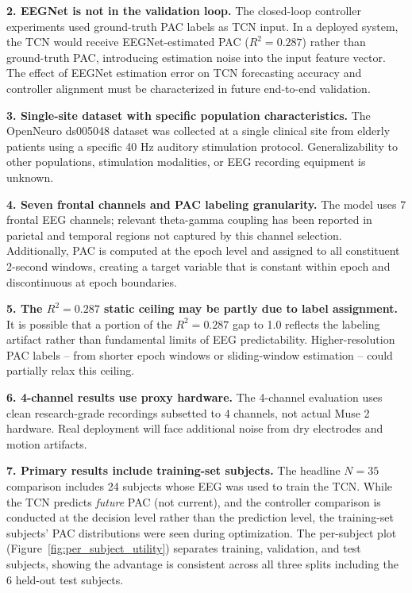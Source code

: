 \documentclass[11pt,letterpaper]{article}
\begin{document}
\textbf{2. EEGNet is not in the validation loop.} The closed-loop controller experiments used ground-truth PAC labels as TCN input. In a deployed system, the TCN would receive EEGNet-estimated PAC ($R^2 = 0.287$) rather than ground-truth PAC, introducing estimation noise into the input feature vector. The effect of EEGNet estimation error on TCN forecasting accuracy and controller alignment must be characterized in future end-to-end validation.

\textbf{3. Single-site dataset with specific population characteristics.} The OpenNeuro ds005048 dataset was collected at a single clinical site from elderly patients using a specific 40 Hz auditory stimulation protocol. Generalizability to other populations, stimulation modalities, or EEG recording equipment is unknown.

\textbf{4. Seven frontal channels and PAC labeling granularity.} The model uses 7 frontal EEG channels; relevant theta-gamma coupling has been reported in parietal and temporal regions not captured by this channel selection. Additionally, PAC is computed at the epoch level and assigned to all constituent 2-second windows, creating a target variable that is constant within epoch and discontinuous at epoch boundaries.

\textbf{5. The $R^2 = 0.287$ static ceiling may be partly due to label assignment.} It is possible that a portion of the $R^2 = 0.287$ gap to 1.0 reflects the labeling artifact rather than fundamental limits of EEG predictability. Higher-resolution PAC labels -- from shorter epoch windows or sliding-window estimation -- could partially relax this ceiling.

\textbf{6. 4-channel results use proxy hardware.} The 4-channel evaluation uses clean research-grade recordings subsetted to 4 channels, not actual Muse 2 hardware. Real deployment will face additional noise from dry electrodes and motion artifacts.

\textbf{7. Primary results include training-set subjects.} The headline $N = 35$ comparison includes 24 subjects whose EEG was used to train the TCN. While the TCN predicts \textit{future} PAC (not current), and the controller comparison is conducted at the decision level rather than the prediction level, the training-set subjects' PAC distributions were seen during optimization. The per-subject plot (Figure~\ref{fig:per_subject_utility}) separates training, validation, and test subjects, showing the advantage is consistent across all three splits including the 6 held-out test subjects.
\end{document}
